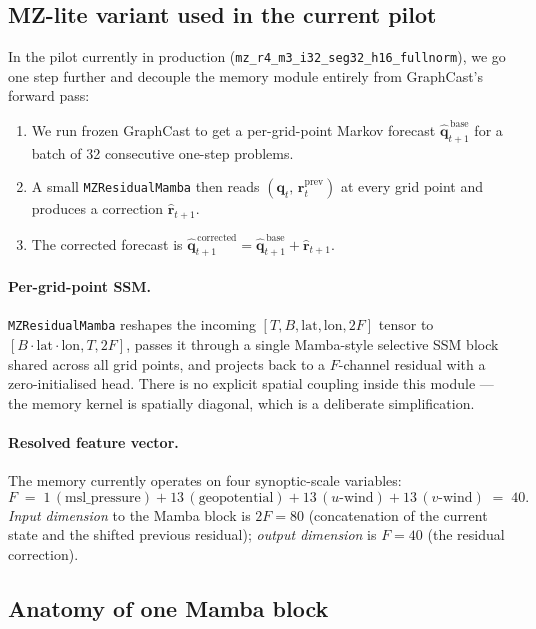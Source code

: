\documentclass[11pt,a4paper]{article}
\begin{document}
\subsection{MZ-lite variant used in the current pilot}

In the pilot currently in production (\texttt{mz\_r4\_m3\_i32\_seg32\_h16\_fullnorm}), we go one step further and decouple the memory module entirely from GraphCast's forward pass:

\begin{enumerate}[nosep]
  \item We run frozen GraphCast to get a per-grid-point Markov forecast $\widehat{\mathbf{q}}^{\,\text{base}}_{t+1}$ for a batch of 32 consecutive one-step problems.
  \item A small \texttt{MZResidualMamba} then reads $(\mathbf{q}_t,\,\mathbf{r}^{\text{prev}}_t)$ at every grid point and produces a correction $\widehat{\mathbf{r}}_{t+1}$.
  \item The corrected forecast is $\widehat{\mathbf{q}}^{\,\text{corrected}}_{t+1} = \widehat{\mathbf{q}}^{\,\text{base}}_{t+1} + \widehat{\mathbf{r}}_{t+1}$.
\end{enumerate}

\paragraph{Per-grid-point SSM.}
\texttt{MZResidualMamba} reshapes the incoming $[T, B, \mathrm{lat}, \mathrm{lon}, 2F]$ tensor to $[B{\cdot}\mathrm{lat}{\cdot}\mathrm{lon}, T, 2F]$, passes it through a single Mamba-style selective SSM block shared across all grid points, and projects back to a $F$-channel residual with a zero-initialised head. There is no explicit spatial coupling inside this module --- the memory kernel is spatially diagonal, which is a deliberate simplification.

\paragraph{Resolved feature vector.}
The memory currently operates on four synoptic-scale variables:
\[
F \;=\; 1\,(\text{msl\_pressure}) + 13\,(\text{geopotential}) + 13\,(u\text{-wind}) + 13\,(v\text{-wind}) \;=\; 40.
\]
\emph{Input dimension} to the Mamba block is $2F = 80$ (concatenation of the current state and the shifted previous residual); \emph{output dimension} is $F = 40$ (the residual correction).

\subsection{Anatomy of one Mamba block}
\end{document}
